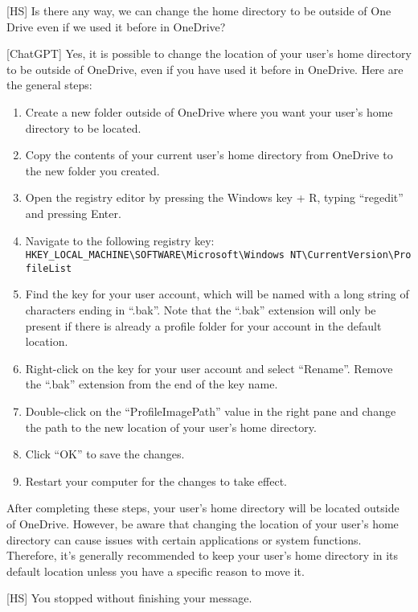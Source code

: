 \documentclass[
]{bxjsbook}
\providecommand{\tightlist}{%
  \setlength{\itemsep}{0pt}\setlength{\parskip}{0pt}}
\theoremstyle{definition}
\theoremstyle{definition}
\theoremstyle{definition}
\theoremstyle{definition}
\theoremstyle{remark}
\begin{document}
{[}HS{]} Is there any way, we can change the home directory to be outside of One Drive even if we used it before in OneDrive?

{[}ChatGPT{]} Yes, it is possible to change the location of your user's home directory to be outside of OneDrive, even if you have used it before in OneDrive. Here are the general steps:

\begin{enumerate}
\def\labelenumi{\arabic{enumi}.}
\tightlist
\item
  Create a new folder outside of OneDrive where you want your user's home directory to be located.
\item
  Copy the contents of your current user's home directory from OneDrive to the new folder you created.
\item
  Open the registry editor by pressing the Windows key + R, typing ``regedit'' and pressing Enter.
\item
  Navigate to the following registry key: \texttt{HKEY\_LOCAL\_MACHINE\textbackslash{}SOFTWARE\textbackslash{}Microsoft\textbackslash{}Windows\ NT\textbackslash{}CurrentVersion\textbackslash{}ProfileList}
\item
  Find the key for your user account, which will be named with a long string of characters ending in ``.bak''. Note that the ``.bak'' extension will only be present if there is already a profile folder for your account in the default location.
\item
  Right-click on the key for your user account and select ``Rename''. Remove the ``.bak'' extension from the end of the key name.
\item
  Double-click on the ``ProfileImagePath'' value in the right pane and change the path to the new location of your user's home directory.
\item
  Click ``OK'' to save the changes.
\item
  Restart your computer for the changes to take effect.
\end{enumerate}

After completing these steps, your user's home directory will be located outside of OneDrive. However, be aware that changing the location of your user's home directory can cause issues with certain applications or system functions. Therefore, it's generally recommended to keep your user's home directory in its default location unless you have a specific reason to move it.

{[}HS{]} You stopped without finishing your message.
\end{document}
